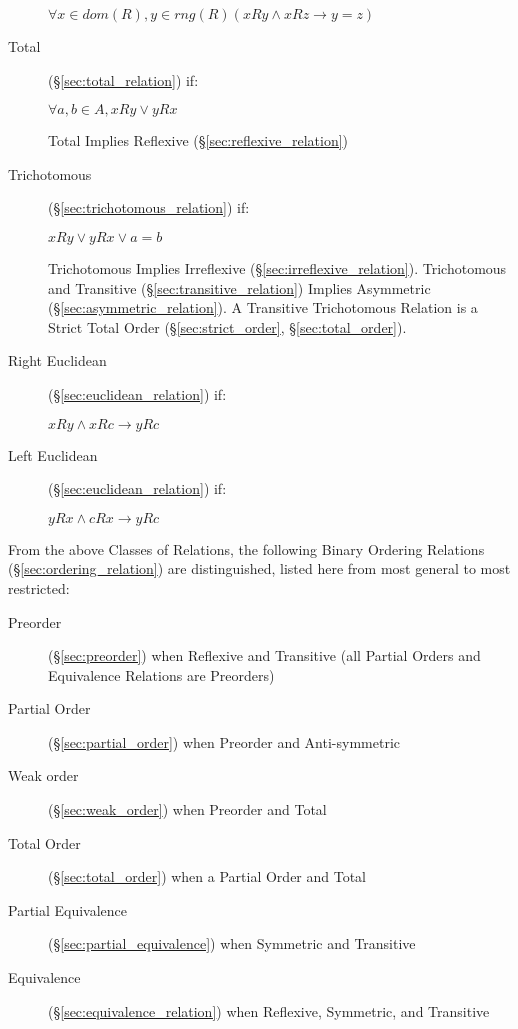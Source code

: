 \begin{description}
  $ \forall x \in dom(R), y \in rng(R)
    (xRy \wedge xRz \to y = z) $

\item[Total] (\S\ref{sec:total_relation}) if:

  $ \forall a,b \in A, xRy \vee yRx $

  Total Implies Reflexive (\S\ref{sec:reflexive_relation})

\item[Trichotomous] (\S\ref{sec:trichotomous_relation}) if:

  $ xRy \vee yRx \vee a = b $

  Trichotomous Implies Irreflexive (\S\ref{sec:irreflexive_relation}).
  Trichotomous and Transitive (\S\ref{sec:transitive_relation})
  Implies Asymmetric (\S\ref{sec:asymmetric_relation}). A Transitive
  Trichotomous Relation is a Strict Total Order
  (\S\ref{sec:strict_order}, \S\ref{sec:total_order}).

\item[Right Euclidean] (\S\ref{sec:euclidean_relation}) if:

  $ xRy \wedge xRc \to yRc $

\item[Left Euclidean] (\S\ref{sec:euclidean_relation}) if:

  $ yRx \wedge cRx \to yRc $

\end{description}

From the above Classes of Relations, the following Binary Ordering
Relations (\S\ref{sec:ordering_relation}) are distinguished, listed
here from most general to most restricted:

\begin{description}
\item[Preorder] (\S\ref{sec:preorder}) when Reflexive and Transitive
  (all Partial Orders and Equivalence Relations are Preorders)
\item[Partial Order] (\S\ref{sec:partial_order}) when Preorder and
  Anti-symmetric
\item[Weak order] (\S\ref{sec:weak_order}) when Preorder and Total
\item[Total Order] (\S\ref{sec:total_order}) when a Partial Order and
  Total
\item[Partial Equivalence] (\S\ref{sec:partial_equivalence}) when
  Symmetric and Transitive
\item[Equivalence] (\S\ref{sec:equivalence_relation}) when Reflexive,
  Symmetric, and Transitive
\end{description}

